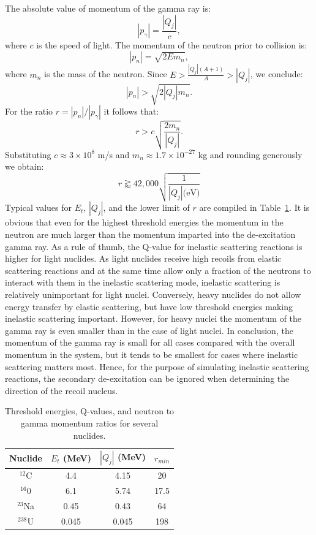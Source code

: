 \documentclass[review]{elsarticle}
\begin{document}
The absolute value of momentum of the gamma ray is:
\begin{equation}\label{eq:momentum_gamma_ray}
  |p_{\gamma} |= \frac{|Q_j|}{c},
\end{equation}
where $c$ is the speed of light. The momentum of the neutron prior to collision is:
\begin{equation}
  |p_n| = \sqrt{2 E m_n},
\end{equation}
where $m_n$ is the mass of the neutron. Since $E > \frac{|Q_j| (A+1)}{A} > |Q_j|$, we conclude:
\begin{equation}
  |p_n| > \sqrt{2 |Q_j| m_n}.
\end{equation}
For the ratio $r = |p_n| / |p_{\gamma}|$ it follows that:
\begin{equation}
  r > c \sqrt{\frac{2 m_n}{|Q_j|}}.
\end{equation}
Substituting $c\approx 3 \times 10^8 $ m/s and $m_n\approx 1.7 \times 10^{-27}$ kg and rounding generously we obtain:
\begin{equation}
 r   \gtrapprox 42,000 \sqrt{\frac{1}{|Q_j| \text{(eV)}}}
\end{equation}
Typical values for $E_t$, $|Q_j|$, and the lower limit of $r$ are compiled in Table~\ref{table:typical_Q}. It is obvious that even for the highest threshold energies the momentum in the neutron are
much larger than the momentum imparted into the de-excitation gamma ray. 
As a rule of thumb, the Q-value for inelastic scattering reactions is higher for light nuclides. As light nuclides receive high recoils from elastic scattering reactions and at the same time allow only a fraction of the neutrons to interact with them in the inelastic scattering mode, inelastic scattering is relatively unimportant for light nuclei. Conversely, heavy nuclides do not allow energy transfer by elastic scattering, but
have low threshold energies making inelastic scattering important. However, for heavy nuclei the momentum of the gamma ray is even smaller than in the case of light nuclei. In conclusion, the momentum of the gamma ray is small for all cases compared with the overall momentum in the system, but it tends to be smallest for cases where inelastic scattering matters most. Hence, for the purpose of simulating inelastic scattering reactions, the secondary de-excitation can be ignored when determining the direction of the recoil nucleus.

\begin{table}[htbp]
\caption{Threshold energies, Q-values, and neutron to gamma momentum ratios for several nuclides.}
\centering
\begin{tabular}{c c c c}
\toprule
Nuclide & $E_t$ (MeV) & $|Q_j|$ (MeV) & $r_{min}$ \\
\midrule
$^{12}$C & 4.4 & 4.15 & 20 \\
$^{16}$0 & 6.1 & 5.74 & 17.5 \\
$^{23}$Na & 0.45 & 0.43 & 64 \\
$^{238}$U & 0.045 & 0.045 & 198 \\
\bottomrule
\end{tabular}
\label{table:typical_Q}
\end{table}
\end{document}
